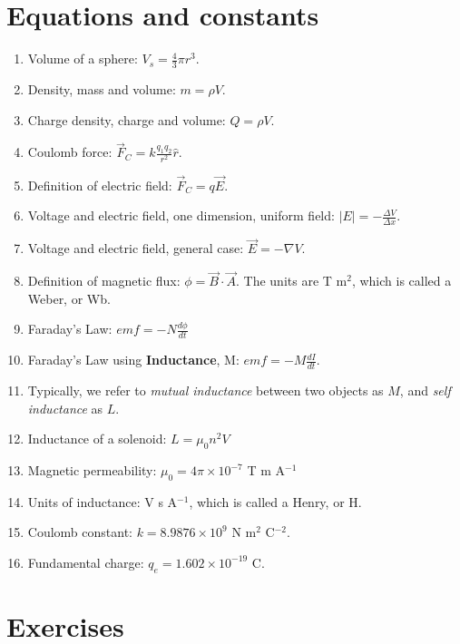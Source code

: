 \documentclass[10pt]{article}
\begin{document}
\maketitle

\section{Equations and constants}

\begin{enumerate}
\item Volume of a sphere: $V_s = \frac{4}{3}\pi r^3$.
\item Density, mass and volume: $m = \rho V$.
\item Charge density, charge and volume: $Q = \rho V$.
\item Coulomb force: $\vec{F}_C = k \frac{q_1 q_2}{r^2}\hat{r}$.
\item Definition of electric field: $\vec{F}_C = q\vec{E}$.
\item Voltage and electric field, one dimension, uniform field: $|E| = - \frac{\Delta V}{\Delta x}$.
\item Voltage and electric field, general case: $\vec{E} = -\nabla V$.
\item Definition of magnetic flux: $\phi = \vec{B} \cdot \vec{A}$.  The units are T m$^2$, which is called a Weber, or Wb.
\item Faraday's Law: $emf = -N \frac{d \phi}{d t}$
\item Faraday's Law using \textbf{Inductance}, M: $emf = -M \frac{dI}{dt}$.
\item Typically, we refer to \textit{mutual inductance} between two objects as $M$, and \textit{self inductance} as $L$.
\item Inductance of a solenoid: $L = \mu_0 n^2 V$
\item Magnetic permeability: $\mu_0 = 4\pi \times 10^{-7}$ T m A$^{-1}$
\item Units of inductance: V s A$^{-1}$, which is called a Henry, or H.
\item Coulomb constant: $k = 8.9876 \times 10^{9}$ N m$^2$ C$^{-2}$.
\item Fundamental charge: $q_e = 1.602 \times 10^{-19}$ C.
\end{enumerate}

\clearpage

\section{Exercises}
\end{document}
